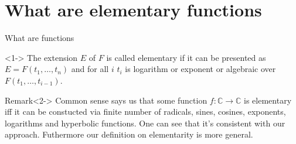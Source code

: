 \documentclass[8pt]{beamer}
\renewcommand{\C}{\ensuremath{\mathbb{C}}}
\renewcommand{\|}{\ensuremath{\hspace{0.1cm} | \hspace{0.1cm}}}
\begin{document}
    

    \section{What are elementary functions}
    \begin{frame}{What are functions}
        \begin{definition}<1->
            The extension $E$ of $F$ is called elementary if it can be presented as $E = F(t_1, \ldots, t_n)$ and for all $i$ $t_i$ is logarithm or exponent or algebraic over $F(t_1, \ldots, t_{i-1})$.
        \end{definition}
        \begin{block}{Remark}<2->
            Common sense says us that some function $f: \C \to \C$ is elementary iff it can be constucted via finite number of radicals, sines, cosines, exponents, logarithms and hyperbolic functions.
            One can see that it's consistent with our approach. Futhermore our definition on elementarity is more general.
        \end{block}
    \end{frame}
\end{document}
